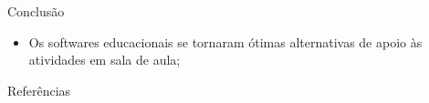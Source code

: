 \documentclass[svgnames,handout,aspectratio=169]{beamer}
\begin{document}
\begin{frame}{Conclusão}

\begin{itemize}
    \item Os softwares educacionais se tornaram ótimas alternativas de apoio às atividades em sala de aula;
\end{itemize}
\end{frame}





\begin{frame}{Referências}


\end{frame}





\end{document}
